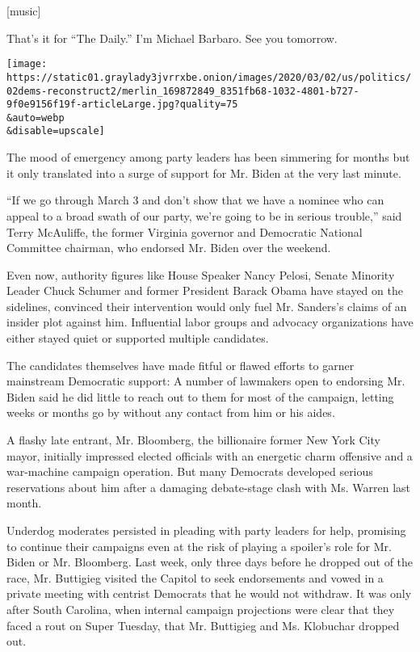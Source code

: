 {[}music{]}

That's it for ``The Daily.'' I'm Michael Barbaro. See you tomorrow.

\texttt{[image: https://static01.graylady3jvrrxbe.onion/images/2020/03/02/us/politics/02dems-reconstruct2/merlin\_169872849\_8351fb68-1032-4801-b727-9f0e9156f19f-articleLarge.jpg?quality=75\\\&auto=webp\\\&disable=upscale]}

The mood of emergency among party leaders has been simmering for months
but it only translated into a surge of support for Mr. Biden at the very
last minute.

``If we go through March 3 and don't show that we have a nominee who can
appeal to a broad swath of our party, we're going to be in serious
trouble,'' said Terry McAuliffe, the former Virginia governor and
Democratic National Committee chairman, who endorsed Mr. Biden over the
weekend.

Even now, authority figures like House Speaker Nancy Pelosi, Senate
Minority Leader Chuck Schumer and former President Barack Obama have
stayed on the sidelines, convinced their intervention would only fuel
Mr. Sanders's claims of an insider plot against him. Influential labor
groups and advocacy organizations have either stayed quiet or supported
multiple candidates.

The candidates themselves have made fitful or flawed efforts to garner
mainstream Democratic support: A number of lawmakers open to endorsing
Mr. Biden said he did little to reach out to them for most of the
campaign, letting weeks or months go by without any contact from him or
his aides.

A flashy late entrant, Mr. Bloomberg, the billionaire former New York
City mayor, initially impressed elected officials with an energetic
charm offensive and a war-machine campaign operation. But many Democrats
developed serious reservations about him after a damaging debate-stage
clash with Ms. Warren last month.

Underdog moderates persisted in pleading with party leaders for help,
promising to continue their campaigns even at the risk of playing a
spoiler's role for Mr. Biden or Mr. Bloomberg. Last week, only three
days before he dropped out of the race, Mr. Buttigieg visited the
Capitol to seek endorsements and vowed in a private meeting with
centrist Democrats that he would not withdraw. It was only after South
Carolina, when internal campaign projections were clear that they faced
a rout on Super Tuesday, that Mr. Buttigieg and Ms. Klobuchar dropped
out.

